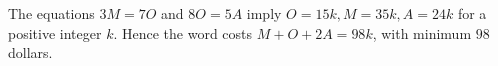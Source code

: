 The equations $3M=7O$ and $8O=5A$ imply $O=15k,M=35k,A=24k$ for a positive integer $k$. Hence the word costs $M+O+2A=98k$, with minimum $\boxed{98}$ dollars.
